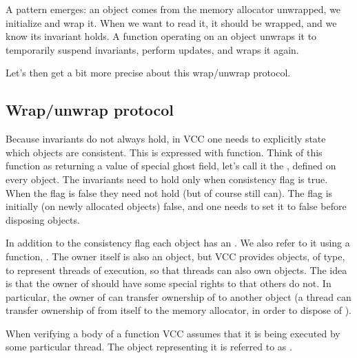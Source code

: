 
\noindent
A pattern emerges: an object comes from the memory allocator unwrapped, 
we initialize and wrap it.
When we want to read it, it should be wrapped, and we know its invariant holds.
A function operating on an object unwraps it to temporarily suspend invariants, perform updates, and wraps it again.

Let's then get a bit more precise about this wrap/unwrap protocol. 

\subsection{Wrap/unwrap protocol}

Because invariants do not always hold,
in VCC one needs to explicitly state which objects are consistent.
This is expressed with  function.
Think of this function as returning a value of special ghost field,
let's call it the , defined on every object.
The invariants need to hold only when consistency flag is true.
When the flag is false they need not hold (but of course still can).
The flag is initially (on newly allocated objects) false,
and one needs to set it to false before disposing objects.

In addition to the consistency flag each object has an .
We also refer to it using a function, .
The owner itself is also an object, but VCC provides objects, of \vcc{\thread}
type, to represent threads of execution, so that threads can also own objects.
The idea is that the owner of  should have some special rights to  that others do not.
In particular, the owner of  can transfer ownership of  to
another object (\eg a thread can transfer ownership of  from itself to the memory allocator, 
in order to dispose of ).

When verifying a body of a function VCC assumes that it is being executed by some
particular thread.
The \vcc{\thread} object representing it is referred to as \vcc{\me}.

